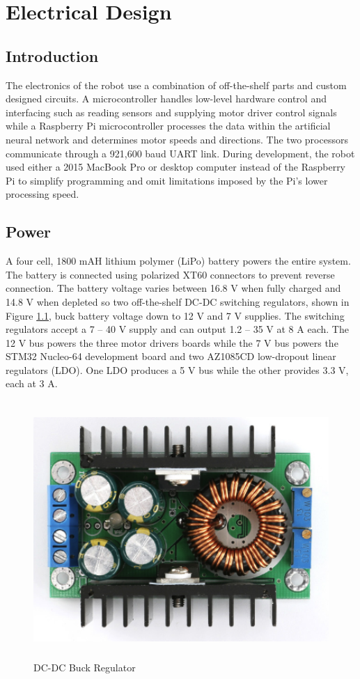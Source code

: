 \chapter{Electrical Design}
\section{Introduction}
The electronics of the robot use a combination of off-the-shelf parts and custom designed circuits. A microcontroller handles low-level hardware control and interfacing such as reading sensors and supplying motor driver control signals while a Raspberry Pi microcontroller processes the data within the artificial neural network and determines motor speeds and directions. The two processors communicate through a 921,600 baud UART link. During development, the robot used either a 2015 MacBook Pro or desktop computer instead of the Raspberry Pi to simplify programming and omit limitations imposed by the Pi's lower processing speed.

\section{Power}
A four cell, 1800 mAH lithium polymer (LiPo) battery powers the entire system. The battery is connected using polarized XT60 connectors to prevent reverse connection. The battery voltage varies between 16.8 V when fully charged and 14.8 V when depleted so two off-the-shelf DC-DC switching regulators, shown in Figure \ref{fig:smps}, buck battery voltage down to 12 V and 7 V supplies. The switching regulators accept a 7 -- 40 V supply and can output 1.2 -- 35 V at 8 A each. The 12 V bus powers the three motor drivers boards while the 7 V bus powers the STM32 Nucleo-64 development board and two AZ1085CD low-dropout linear regulators (LDO). One LDO produces a 5 V bus while the other provides 3.3 V, each at 3 A. 

\begin{figure}[H]   %
	\centering \includegraphics[width=6in, height=3.85in, keepaspectratio]{figures/smps.png}
	\caption{DC-DC Buck Regulator \cite{smps}}\label{fig:smps}
\end{figure}

